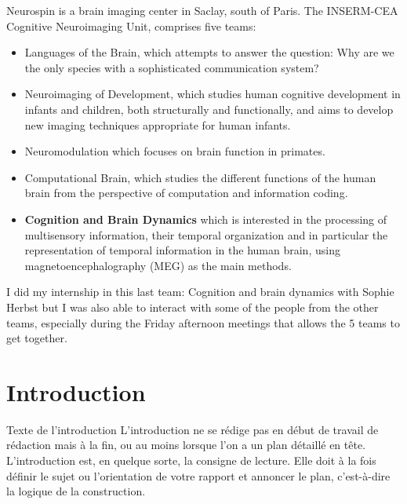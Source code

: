 Neurospin is a brain imaging center in Saclay, south of Paris. The INSERM-CEA Cognitive Neuroimaging Unit, comprises five teams:

\begin{itemize}
    \item Languages of the Brain, which attempts to answer the question: Why are we the only species with a sophisticated communication system?
    \item Neuroimaging of Development, which studies human cognitive development in infants and children, both structurally and functionally, and aims to develop new imaging techniques appropriate for human infants.
    \item Neuromodulation which focuses on brain function in primates.
    \item Computational Brain, which studies the different functions of the human brain from the perspective of computation and information coding.
    \item \textbf{Cognition and Brain Dynamics} which is interested in the processing of multisensory information, their temporal organization and in particular the representation of temporal information in the human brain, using magnetoencephalography (MEG) as the main methods.
\end{itemize}

I did my internship in this last team: Cognition and brain dynamics with Sophie Herbst but I was also able to interact with some of the people from the other teams, especially during the Friday afternoon meetings that allows the 5 teams to get together.








\chapter*{Introduction}

Texte de l'introduction
L’introduction ne se rédige pas en début de travail de rédaction mais à la fin, ou au moins lorsque l’on a un plan détaillé en tête.
L’introduction est, en quelque sorte, la consigne de lecture. Elle doit à la fois définir le sujet ou l’orientation de votre rapport et annoncer le plan, c’est-à-dire la logique de la construction.

